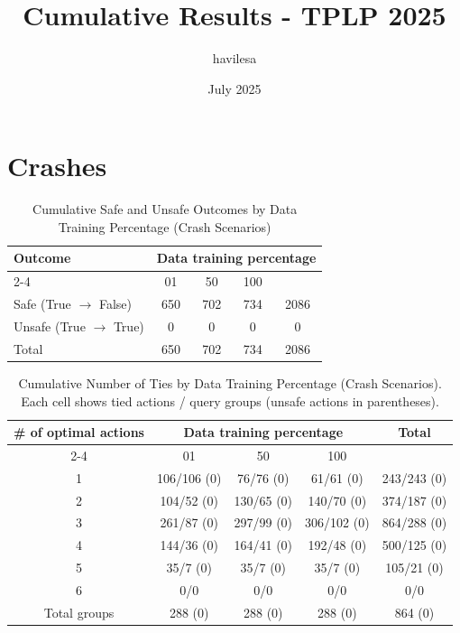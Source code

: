 \documentclass{article}
\title{Cumulative Results - TPLP 2025}
\author{havilesa}
\date{July 2025}
\begin{document}
\maketitle

\section{Crashes}
\begin{table}[h]
\centering
\caption{Cumulative Safe and Unsafe Outcomes by Data Training Percentage (Crash Scenarios)}
\begin{tabular}{l|ccc|c}
\toprule
\multirow{2}{*}{Outcome} & \multicolumn{5}{c|}{Data training percentage} & \multirow{2}{*}{Total} \\
\cmidrule{2-4}
 & 01 & 50 & 100 & \\
\midrule
Safe (True $\rightarrow$ False) & 650 & 702 & 734 & 2086 \\ 
Unsafe (True $\rightarrow$ True) & 0 & 0 & 0 & 0 \\ 
\midrule
Total & 650 & 702 & 734 & 2086 \\ 
\bottomrule
\end{tabular}
\end{table}

\begin{table}[h]
\centering
\caption{Cumulative Number of Ties by Data Training Percentage (Crash Scenarios).
Each cell shows tied actions / query groups (unsafe actions in parentheses).}
\begin{tabular}{c|ccc|c}
\toprule
\multirow{2}{*}{\# of optimal actions} & \multicolumn{3}{c|}{Data training percentage} & \multirow{2}{*}{Total} \\
\cmidrule{2-4}
 & 01 & 50 & 100 & \\
\midrule
1 & 106/106 (0) & 76/76 (0) & 61/61 (0) & 243/243 (0) \\ 
2 & 104/52 (0) & 130/65 (0) & 140/70 (0) & 374/187 (0) \\ 
3 & 261/87 (0) & 297/99 (0) & 306/102 (0) & 864/288 (0) \\ 
4 & 144/36 (0) & 164/41 (0) & 192/48 (0) & 500/125 (0) \\ 
5 & 35/7 (0) & 35/7 (0) & 35/7 (0) & 105/21 (0) \\ 
6 & 0/0 & 0/0 & 0/0 & 0/0 \\ 
\midrule
Total groups & 288 (0) & 288 (0) & 288 (0) & 864 (0) \\ 
\bottomrule
\end{tabular}
\end{table}
\end{document}
